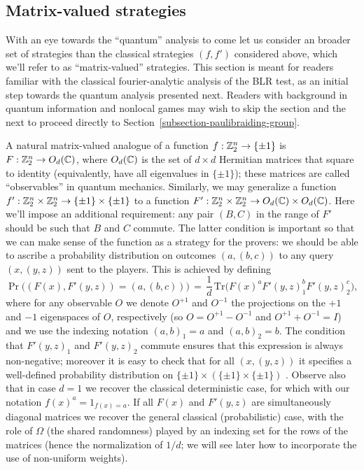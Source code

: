 \subsection{Matrix-valued strategies}

With an eye towards the ``quantum'' analysis to come let us consider an broader set of strategies than the classical strategies $(f,f')$ considered above, which we'll refer to as ``matrix-valued'' strategies. This section is meant for readers familiar with the classical fourier-analytic analysis of the BLR test, as an initial step towards the quantum analysis presented next. Readers with background in quantum information and nonlocal games may wish to skip the section and the next to proceed directly to Section~\ref{subsection-paulibraiding-group}. 

A natural matrix-valued analogue of a function $f:\mathbb{Z}_2^n \to \{\pm 1\}$ is $F:\mathbb{Z}_2^n \to O_d(\mathbb{C})$, where $O_d(\mathbb{C})$ is the set of $d\times d$ Hermitian matrices that square to identity (equivalently, have all eigenvalues in $\{\pm 1\}$); these matrices are called ``observables'' in quantum mechanics. Similarly, we may generalize a function  $f':\mathbb{Z}_2^n \times \mathbb{Z}_2^n \to \{\pm 1 \} \times \{\pm 1\}$ to a function  $F':\mathbb{Z}_2^n \times \mathbb{Z}_2^n \to O_d(\mathbb{C}) \times O_d(\mathbb{C})$. Here we'll impose an additional requirement: any pair $(B,C)$ in the range of $F'$ should be such that $B$ and $C$ commute. The latter condition is important so that we can make sense of the function as a strategy for the provers: we should be able to ascribe a probability distribution on outcomes $(a,(b,c))$ to any query $(x,(y,z))$ sent to the players. This is achieved by defining 
\begin{equation}\label{eq:matrixprob}
\Pr\big((F(x), F'(y,z))=(a,(b,c))\big)\,=\,\frac{1}{d}\,\mathrm{Tr}\big( F(x)^aF'(y,z)_1^b F'(y,z)_2^c\big),
\end{equation}
where for any observable $O$ we denote $O^{+1}$ and $O^{-1}$ the projections on the $+1$ and $-1$ eigenspaces of $O$, respectively (so $O=O^{+1}-O^{-1}$ and $O^{+1}+O^{-1}=I$) and we use the indexing notation $(a,b)_1=a$ and $(a,b)_2=b$. The condition that $F'(y,z)_1$ and $F'(y,z)_2$ commute ensures that this expression is always non-negative; moreover it is easy to check that for all $(x,(y,z))$ it specifies a well-defined probability distribution on $\{\pm 1\}\times (\{\pm1\}\times \{\pm1\})$ . Observe also that in case $d=1$ we recover the classical deterministic case, for which with our notation $f(x)^a = 1_{f(x)=a}$. If all $F(x)$ and $F'(y,z)$ are simultaneously diagonal matrices we recover the general classical (probabilistic) case, with the role of $\Omega$ (the shared randomness) played by an indexing set for the rows of the matrices (hence the normalization of $1/d$; we will see later how to incorporate the use of non-uniform weights). 

